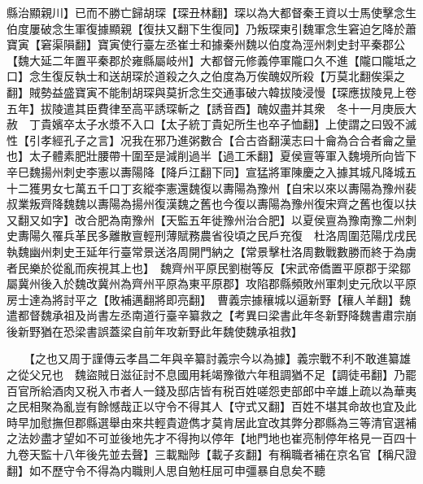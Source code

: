 縣治顯親川】已而不勝亡歸胡琛【琛丑林翻】琛以為大都督秦王資以士馬使擊念生伯度屢破念生軍復據顯親【復扶又翻下生復同】乃叛琛東引魏軍念生窘迫乞降於蕭寶寅【窘渠隕翻】寶寅使行臺左丞崔士和據秦州魏以伯度為涇州刺史封平秦郡公【魏大延二年置平秦郡於雍縣屬岐州】大都督元修義停軍隴口久不進【隴口隴坻之口】念生復反執士和送胡琛於道殺之久之伯度為万俟醜奴所殺【万莫北翻俟渠之翻】賊勢益盛寶寅不能制胡琛與莫折念生交通事破六韓拔陵浸慢【琛應拔陵見上卷五年】拔陵遣其臣費律至高平誘琛斬之【誘音酉】醜奴盡并其衆　冬十一月庚辰大赦　丁貴嬪卒太子水漿不入口【太子統丁貴妃所生也卒子恤翻】上使謂之曰毁不滅性【引孝經孔子之言】况我在邪乃進粥數合【合古沓翻漢志曰十龠為合合者龠之量也】太子體素肥壯腰帶十圍至是減削過半【過工禾翻】夏侯亶等軍入魏境所向皆下辛巳魏揚州刺史李憲以夀陽降【降戶江翻下同】宣猛將軍陳慶之入據其城凡降城五十二獲男女七萬五千口丁亥縱李憲還魏復以夀陽為豫州【自宋以來以夀陽為豫州裴叔業叛齊降魏魏以夀陽為揚州復漢魏之舊也今復以夀陽為豫州復宋齊之舊也復以扶又翻又如字】改合肥為南豫州【天監五年徙豫州治合肥】以夏侯亶為豫南豫二州刺史夀陽久罹兵革民多離散亶輕刑薄賦務農省役頃之民戶充復　杜洛周圍范陽戊戌民執魏幽州刺史王延年行臺常景送洛周開門納之【常景擊杜洛周數戰數勝而終于為虜者民樂於從亂而疾視其上也】　魏齊州平原民劉樹等反【宋武帝僑置平原郡于梁鄒屬冀州後入於魏改冀州為齊州平原為東平原郡】攻陷郡縣頻敗州軍刺史元欣以平原房士達為將討平之【敗補邁翻將即亮翻】　曹義宗據穰城以逼新野【穰人羊翻】魏遣都督魏承祖及尚書左丞南道行臺辛纂救之【考異曰梁書此年冬新野降魏書肅宗崩後新野猶在恐梁書誤蓋梁自前年攻新野此年魏使魏承祖救】

　　【之也又周于謹傳云孝昌二年與辛纂討義宗今以為據】義宗戰不利不敢進纂雄之從父兄也　魏盜賊日滋征討不息國用耗竭豫徵六年租調猶不足【調徒弔翻】乃罷百官所給酒肉又税入市者人一錢及邸店皆有税百姓嗟怨吏部郎中辛雄上疏以為華夷之民相聚為亂豈有餘憾哉正以守令不得其人【守式又翻】百姓不堪其命故也宜及此時早加慰撫但郡縣選舉由來共輕貴遊儁才莫肯居此宜改其弊分郡縣為三等清官選補之法妙盡才望如不可並後地先才不得拘以停年【地門地也崔亮制停年格見一百四十九卷天監十八年後先並去聲】三載黜陟【載子亥翻】有稱職者補在京名官【稱尺證翻】如不歷守令不得為内職則人思自勉枉屈可申彊暴自息矣不聽

